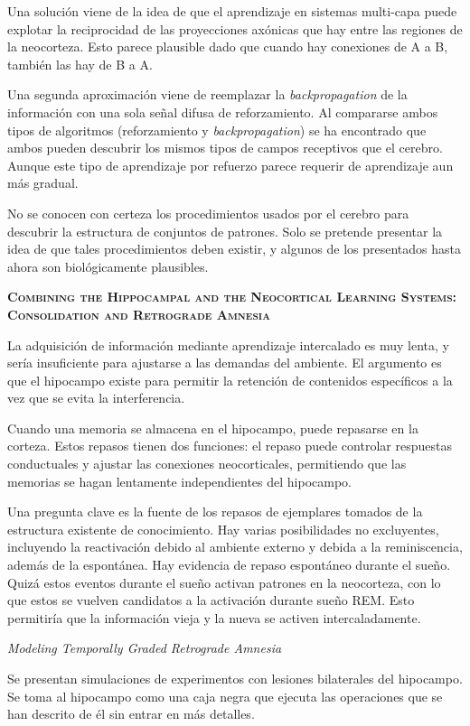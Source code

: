 \documentclass[a4paper,12pt]{article}
\begin{document}
Una solución viene de la idea de que el aprendizaje en sistemas multi-capa puede explotar la reciprocidad de las proyecciones axónicas que hay entre las regiones de la neocorteza. Esto parece plausible dado que cuando hay conexiones de A a B, también las hay de B a A. 

Una segunda aproximación viene de reemplazar la {\itshape backpropagation} de la información con una sola señal difusa de reforzamiento. Al compararse ambos tipos de algoritmos (reforzamiento y {\itshape backpropagation}) se ha encontrado que ambos pueden descubrir los mismos tipos de campos receptivos que el cerebro. Aunque este tipo de aprendizaje por refuerzo parece requerir de aprendizaje aun más gradual.

No se conocen con certeza los procedimientos usados por el cerebro para descubrir la estructura de conjuntos de patrones. Solo se pretende presentar la idea de que tales procedimientos deben existir, y algunos de los presentados hasta ahora son biológicamente plausibles. 

{\scshape\bfseries Combining the Hippocampal and the Neocortical Learning Systems: Consolidation and Retrograde Amnesia}

La adquisición de información mediante aprendizaje intercalado es muy lenta, y sería insuficiente para ajustarse a las demandas del ambiente. El argumento es que el hipocampo existe para permitir la retención de contenidos específicos a la vez que se evita la interferencia. 

Cuando una memoria se almacena en el hipocampo, puede repasarse en la corteza. Estos repasos tienen dos funciones: el repaso puede controlar respuestas conductuales y ajustar las conexiones neocorticales, permitiendo que las memorias se hagan lentamente independientes del hipocampo.

Una pregunta clave es la fuente de los repasos de ejemplares tomados de la estructura existente de conocimiento. Hay varias posibilidades no excluyentes, incluyendo la reactivación debido al ambiente externo y debida a la reminiscencia, además de la espontánea. Hay evidencia de repaso espontáneo durante el sueño. Quizá estos eventos durante el sueño activan patrones en la neocorteza, con lo que estos se vuelven candidatos a la activación durante sueño REM. Esto permitiría que la información vieja y la nueva se activen intercaladamente.

{\itshape Modeling Temporally Graded Retrograde Amnesia}

Se presentan simulaciones de experimentos con lesiones bilaterales del hipocampo. Se toma al hipocampo como una caja negra que ejecuta las operaciones que se han descrito de él sin entrar en más detalles.
\end{document}

